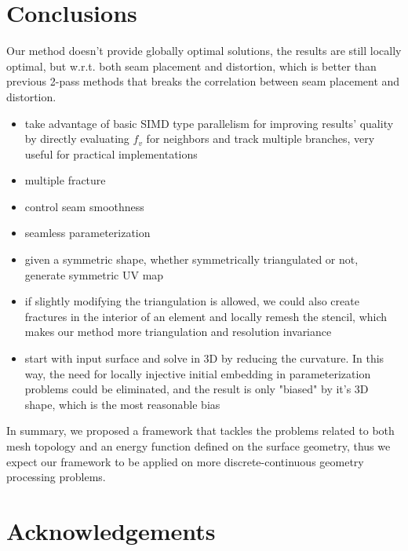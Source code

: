 
\section{Conclusions}
\label{sec:conclusion}

Our method doesn't provide globally optimal solutions, the results are still locally optimal, but w.r.t. both seam placement and distortion, which is better than previous 2-pass methods that breaks the correlation between seam placement and distortion.

\begin{itemize}
\item take advantage of basic SIMD type parallelism for improving results' quality by directly evaluating $f_v$ for neighbors and track multiple branches, very useful for practical implementations
\item multiple fracture
\item control seam smoothness
\item seamless parameterization
\item given a symmetric shape, whether symmetrically triangulated or not, generate symmetric UV map
\item if slightly modifying the triangulation is allowed, we could also create fractures in the interior of an element and locally remesh the stencil, which makes our method more triangulation and resolution invariance
\item start with input surface and solve in 3D by reducing the curvature. In this way, the need for locally injective initial embedding in parameterization problems could be eliminated, and the result is only "biased" by it's 3D shape, which is the most reasonable bias
\end{itemize}

In summary, we proposed a framework that tackles the problems related to both mesh topology and an energy function defined on the surface geometry, thus we expect our framework to be applied on more discrete-continuous geometry processing problems.

\section*{Acknowledgements} 